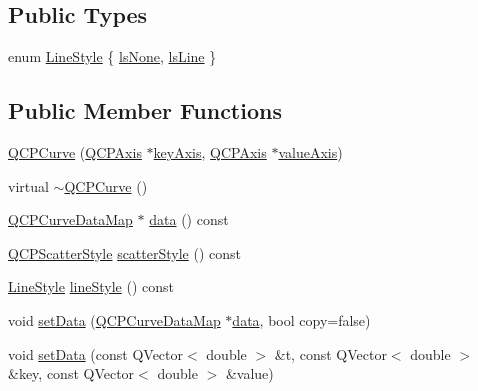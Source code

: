 \subsection*{Public Types}
\begin{DoxyCompactItemize}
\item 
enum \hyperlink{classQCPCurve_a2710e9f79302152cff794c6e16cc01f1}{Line\+Style} \{ \hyperlink{classQCPCurve_a2710e9f79302152cff794c6e16cc01f1aec1601a191cdf0b4e761c4c66092cc48}{ls\+None}, 
\hyperlink{classQCPCurve_a2710e9f79302152cff794c6e16cc01f1ade5822ce6fbf131d3df131795c2e1003}{ls\+Line}
 \}
\end{DoxyCompactItemize}
\subsection*{Public Member Functions}
\begin{DoxyCompactItemize}
\item 
\hyperlink{classQCPCurve_a36de58e2652b3fa47bdf9187d421d3ce}{Q\+C\+P\+Curve} (\hyperlink{classQCPAxis}{Q\+C\+P\+Axis} $\ast$\hyperlink{classQCPAbstractPlottable_a72c7a09c22963f2c943f07112b311103}{key\+Axis}, \hyperlink{classQCPAxis}{Q\+C\+P\+Axis} $\ast$\hyperlink{classQCPAbstractPlottable_a3106f9d34d330a6097a8ec5905e5b519}{value\+Axis})
\item 
virtual \hyperlink{classQCPCurve_a99ee5136754884a220cc0bcacfe419a3}{$\sim$\+Q\+C\+P\+Curve} ()
\item 
\hyperlink{qcustomplot_8h_a444d37ec9cb2951b3a7fe443c34d1658}{Q\+C\+P\+Curve\+Data\+Map} $\ast$ \hyperlink{classQCPCurve_a9ac194d35d4f334923aac9df1bf599ca}{data} () const 
\item 
\hyperlink{classQCPScatterStyle}{Q\+C\+P\+Scatter\+Style} \hyperlink{classQCPCurve_a9ab864c9f6ba0cedf65853f59d867a68}{scatter\+Style} () const 
\item 
\hyperlink{classQCPCurve_a2710e9f79302152cff794c6e16cc01f1}{Line\+Style} \hyperlink{classQCPCurve_a0314dd644258949aeb4a95cebde5abaf}{line\+Style} () const 
\item 
void \hyperlink{classQCPCurve_a631ac886708460013b30052f49cbc9da}{set\+Data} (\hyperlink{qcustomplot_8h_a444d37ec9cb2951b3a7fe443c34d1658}{Q\+C\+P\+Curve\+Data\+Map} $\ast$\hyperlink{classQCPCurve_a9ac194d35d4f334923aac9df1bf599ca}{data}, bool copy=false)
\item 
void \hyperlink{classQCPCurve_affe80e011e2ced62a88f614acd6ab8d1}{set\+Data} (const Q\+Vector$<$ double $>$ \&t, const Q\+Vector$<$ double $>$ \&key, const Q\+Vector$<$ double $>$ \&value)

\end{DoxyCompactItemize}
